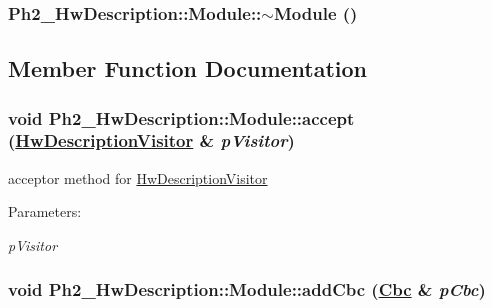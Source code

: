 \hypertarget{class_ph2___hw_description_1_1_module_8142f34ea2308ed78e8d0dbb042bc5f3}{
\subsubsection[$\sim$Module]{\setlength{\rightskip}{0pt plus 5cm}Ph2\_\-Hw\-Description::Module::$\sim$Module ()}}
\label{class_ph2___hw_description_1_1_module_8142f34ea2308ed78e8d0dbb042bc5f3}




\subsection{Member Function Documentation}
\hypertarget{class_ph2___hw_description_1_1_module_67146504a8541df62c47233b859e4103}{
\subsubsection[accept]{\setlength{\rightskip}{0pt plus 5cm}void Ph2\_\-Hw\-Description::Module::accept (\hyperlink{class_hw_description_visitor}{Hw\-Description\-Visitor} \& {\em p\-Visitor})}}
\label{class_ph2___hw_description_1_1_module_67146504a8541df62c47233b859e4103}


acceptor method for \hyperlink{class_hw_description_visitor}{Hw\-Description\-Visitor} 

\begin{Desc}
\item[Parameters:]
\begin{description}
\item[{\em p\-Visitor}]\end{description}
\end{Desc}
\hypertarget{class_ph2___hw_description_1_1_module_c2743d5056bc3053bf472e5fd94bbf14}{
\subsubsection[addCbc]{\setlength{\rightskip}{0pt plus 5cm}void Ph2\_\-Hw\-Description::Module::add\-Cbc (\hyperlink{class_ph2___hw_description_1_1_cbc}{Cbc} \& {\em p\-Cbc})}}
\label{class_ph2___hw_description_1_1_module_c2743d5056bc3053bf472e5fd94bbf14}


